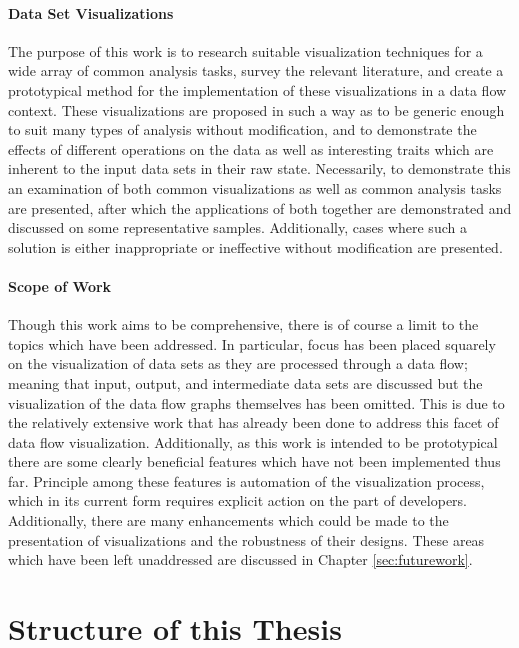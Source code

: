 \paragraph{Data Set Visualizations}
The purpose of this work is to research suitable visualization techniques for a wide array of common analysis tasks, survey the relevant literature, and create a prototypical method for the implementation of these visualizations in a data flow context. These visualizations are proposed in such a way as to be generic enough to suit many types of analysis without modification, and to demonstrate the effects of different operations on the data as well as interesting traits which are inherent to the input data sets in their raw state. Necessarily, to demonstrate this an examination of both common visualizations as well as common analysis tasks are presented, after which the applications of both together are demonstrated and discussed on some representative samples. Additionally, cases where such a solution is either inappropriate or ineffective without modification are presented.

\paragraph{Scope of Work}
Though this work aims to be comprehensive, there is of course a limit to the topics which have been addressed. In particular, focus has been placed squarely on the visualization of data sets as they are processed through a data flow; meaning that input, output, and intermediate data sets are discussed but the visualization of the data flow graphs themselves has been omitted. This is due to the relatively extensive work that has already been done to address this facet of data flow visualization. Additionally, as this work is intended to be prototypical there are some clearly beneficial features which have not been implemented thus far. Principle among these features is automation of the visualization process, which in its current form requires explicit action on the part of developers. Additionally, there are many enhancements which could be made to the presentation of visualizations and the robustness of their designs. These areas which have been left unaddressed are discussed in Chapter \ref{sec:futurework}.

\section{Structure of this Thesis}

